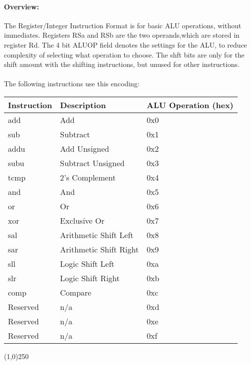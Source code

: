\documentclass[letterpaper, 11pt]{article}
\begin{document}
\paragraph{Overview:}The Register/Integer Instruction Format is for basic ALU operations, without immediates. Registers RSa and RSb are the two operands,which
are stored in register Rd. The 4 bit ALUOP field denotes the settings for the ALU, to reduce complexity of selecting what operation to choose.
The shft bits are only for the shift amount with the shifting instructions, but unused for other instructions. 
\paragraph{}The following instructions use this encoding:\\
\begin{center}
	\begin{longtable}{|l|l|l|}\hline
			Instruction & Description 				& ALU Operation (hex) \\ \hline
			add			& Add 						& 0x0 \\ \hline
			sub 		& Subtract					& 0x1 \\ \hline
			addu 		& Add Unsigned 				& 0x2 \\ \hline
			subu		& Subtract Unsigned 		& 0x3 \\ \hline
			tcmp		& 2's Complement			& 0x4 \\ \hline
			and			& And						& 0x5 \\ \hline
			or			& Or						& 0x6 \\ \hline
			xor			& Exclusive Or				& 0x7 \\ \hline
			sal			& Arithmetic Shift Left		& 0x8 \\ \hline
			sar			& Arithmetic Shift Right	& 0x9 \\ \hline
			sll			& Logic Shift Left			& 0xa \\ \hline
			slr			& Logic Shift Right			& 0xb \\ \hline
			comp		& Compare					& 0xc \\ \hline
			Reserved	& n/a						& 0xd \\ \hline
			Reserved	& n/a						& 0xe \\ \hline
			Reserved	& n/a						& 0xf \\ \hline

\end{longtable}
\end{center}
\begin{center}
	\line(1,0){250}
\end{center}
\end{document}
